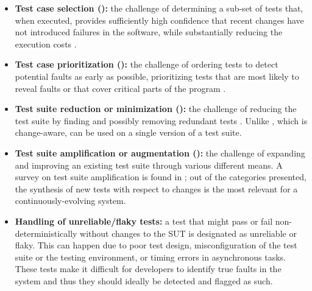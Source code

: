 \begin{itemize}
	\item \textbf{Test case selection (\tcs):} the challenge of determining a sub-set of tests that, when executed, provides sufficiently high confidence that recent changes have not introduced failures in the software, while substantially reducing the execution costs \cite{do_recent_2016, kazmi_effective_2017}.
	\item \textbf{Test case prioritization (\tcp):} the challenge of ordering tests to detect potential faults as early as possible, prioritizing tests that are most likely to reveal faults or that cover critical parts of the program \cite{do_recent_2016, lou_survey_2018}.
	\item \textbf{Test suite reduction or minimization (\tsr):} the challenge of reducing the test suite by finding and possibly removing redundant tests \cite{do_recent_2016, rehman_khan_systematic_2018}. Unlike \tcs, which is change-aware, \tsr can be used on a single version of a test suite.
	\item \textbf{Test suite amplification or augmentation (\tsa):} the challenge of expanding and improving an existing test suite through various different means. A survey on test suite amplification is found in \cite{danglot2019snowballing}; out of the categories presented, the synthesis of new tests with respect to changes is the most relevant for a continuously-evolving system. 
	\item \textbf{Handling of unreliable/flaky tests:} a test that might pass or fail non\hyp deterministically without changes to the SUT is designated as unreliable or flaky. This can happen due to poor test design, misconfiguration of the test suite or the testing environment, or timing errors in asynchronous tasks. These tests make it difficult for developers to identify true faults in the system and thus they should ideally be detected and flagged as such.

\end{itemize}

